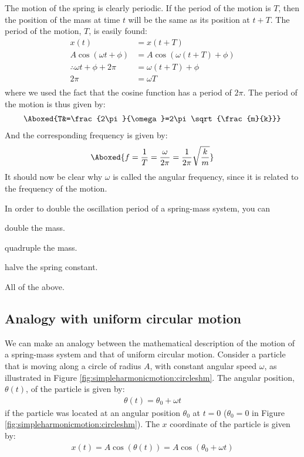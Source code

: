 The motion of the spring is clearly periodic. If the period of the motion is $T$, then the position of the mass at time $t$ will be the same as its position at $t+T$. The period of the motion, $T$, is easily found:
\begin{align*}
x(t) &= x(t+T)\\
A \cos(\omega t + \phi) &= A \cos(\omega (t+T) + \phi)\\
\therefore \omega t + \phi  +2\pi &= \omega (t+T) + \phi\\
2\pi &= \omega T\\
\end{align*}
where we used the fact that the cosine function has a period of $2\pi$. The period of the motion is thus given by:
\begin{align}
\Aboxed{T&=\frac{2\pi}{\omega}=2\pi\sqrt{\frac{m}{k}}}
\end{align}
And the corresponding frequency is given by:
\begin{align}
\Aboxed{f = \frac{1}{T}=\frac{\omega}{2\pi}=\frac{1}{2\pi}\sqrt{\frac{k}{m}}}
\end{align}
It should now be clear why $\omega$ is called the angular frequency, since it is related to the frequency of the motion.

\begin{checkpoint}\label{cp:simpleharmonicmotion:period}
\begin{MCquestion}{In order to double the oscillation period of a spring-mass system, you can}
\item double the mass.
\item quadruple the mass. \correct
\item halve the spring constant.
\item All of the above. 
\end{MCquestion}
\end{checkpoint}

\subsection{Analogy with uniform circular motion}
We can make an analogy between the mathematical description of the motion of a spring-mass system and that of uniform circular motion. Consider a particle that is moving along a circle of radius $A$, with constant angular speed $\omega$, as illustrated in Figure \ref{fig:simpleharmonicmotion:circleshm}.
The angular position, $\theta(t)$, of the particle is given by:
\begin{align*}
\theta(t) = \theta_0 + \omega t
\end{align*}
if the particle was located at an angular position $\theta_0$ at $t=0$ ($\theta_0=0$ in Figure \ref{fig:simpleharmonicmotion:circleshm}). The $x$ coordinate of the particle is given by:
\begin{align*}
x(t) = A\cos(\theta(t)) = A\cos(\theta_0 + \omega t)
\end{align*}

